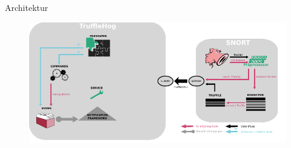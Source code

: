 \begin{frame}{Architektur}
    \begin{figure}
    	\centering
    	\includegraphics[width=\textwidth]{./images/13.pdf}
    \end{figure}
\end{frame}

